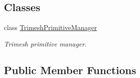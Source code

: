 \subsection*{Classes}
\begin{DoxyCompactItemize}
\item 
class \hyperlink{classbtGImpactMeshShapePart_1_1TrimeshPrimitiveManager}{Trimesh\+Primitive\+Manager}
\begin{DoxyCompactList}\small\item\em Trimesh primitive manager. \end{DoxyCompactList}\end{DoxyCompactItemize}
\subsection*{Public Member Functions}
